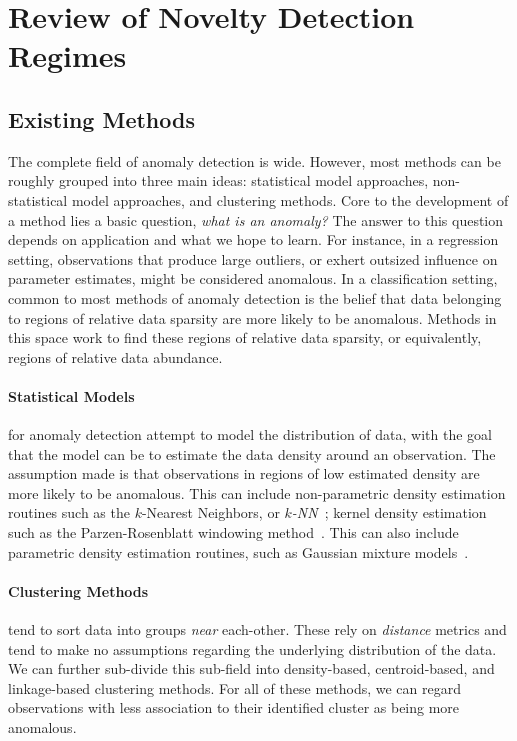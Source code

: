 \section{Review of Novelty Detection Regimes}

\subsection{Existing Methods}
The complete field of anomaly detection is wide.  However, most methods can be roughly grouped into 
    three main ideas: statistical model approaches, non-statistical model approaches, and clustering methods. 
    Core to the development of a method lies a basic question, \emph{what is an anomaly?}  
    The answer to this question depends on application and what we hope to
    learn.  For instance, in a regression setting, observations that produce large outliers, 
    or exhert outsized influence on parameter estimates, might be considered
    anomalous.  In a classification setting, common to most methods of anomaly detection is the belief
    that data belonging to regions of relative data sparsity are more likely to be anomalous.  Methods in
    this space work to find these regions of relative data sparsity, or equivalently, regions of relative
    data abundance.

\paragraph{Statistical Models} for anomaly detection attempt to model the distribution of
    data, with the goal that the model can be to estimate the data density around an observation.
    The assumption made is that observations in regions of low estimated density are more likely to be
    anomalous.  This can include non-parametric density estimation routines such as the $k$-Nearest
    Neighbors, or \emph{$k$-NN}~\citep{kramer2013}; kernel density estimation such as the Parzen-Rosenblatt
    windowing method~\citep{parzen1962,rosenblatt1956}.  This can also include parametric density estimation
    routines, such as Gaussian mixture models~\citep{mcnicholas2010}.

\paragraph{Clustering Methods} tend to sort data into groups \emph{near} each-other.  These rely on
    \emph{distance} metrics and tend to make no assumptions regarding the underlying distribution of the 
    data.  We can further sub-divide this sub-field into density-based, centroid-based, and linkage-based
    clustering methods.  For all of these methods, we can regard observations with less association to 
    their identified cluster as being more anomalous.

